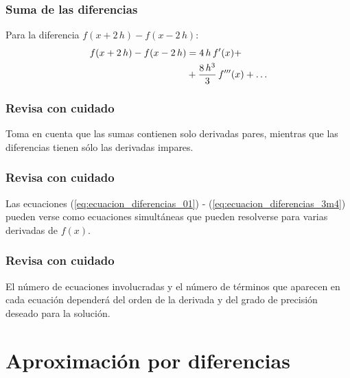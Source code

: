 \begin{frame}
\frametitle{Suma de las diferencias}
Para la diferencia $f(x + 2\, h) - f(x - 2\, h)$:
\begin{align}
\begin{aligned}
f(x + 2 \, h) - f(x - 2 \, h) &= 4 \, h \, {f}^{\prime} (x) + \\
&+ \dfrac{8 \, h^{3}}{3} \, {f}^{\prime \prime \prime} (x) + \ldots
\end{aligned}
\label{eq:ecuacion_diferencias_3m4}
\end{align}
\end{frame}
\begin{frame}
\frametitle{Revisa con cuidado}
Toma en cuenta que las sumas contienen solo derivadas pares, mientras que las diferencias tienen sólo las derivadas impares.
\end{frame}
\begin{frame}
\frametitle{Revisa con cuidado}
Las ecuaciones (\ref{eq:ecuacion_diferencias_01}) - (\ref{eq:ecuacion_diferencias_3m4}) pueden verse como ecuaciones simultáneas que pueden resolverse para varias derivadas de $f(x)$.
\end{frame}
\begin{frame}
\frametitle{Revisa con cuidado}
El número de ecuaciones involucradas y el número de términos que aparecen en cada ecuación dependerá del orden de la derivada y del grado de precisión deseado para la solución.
\end{frame}
\section{Aproximación por diferencias}
